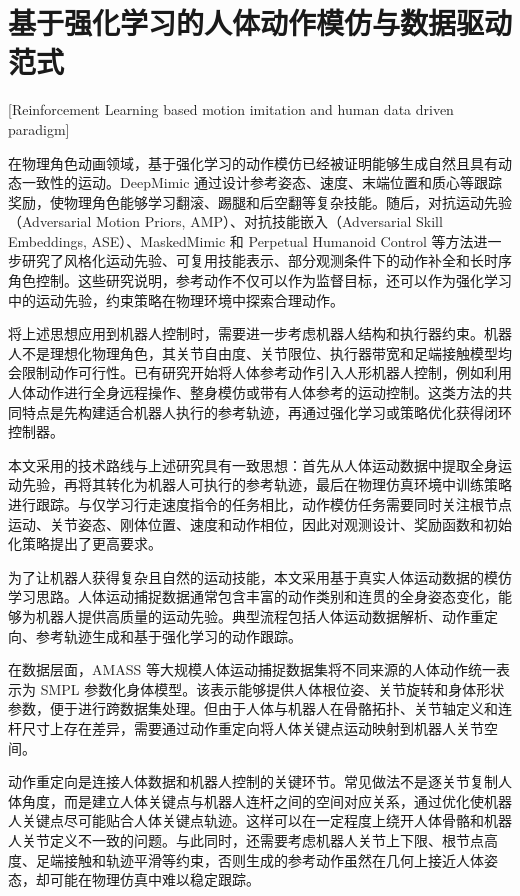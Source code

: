 \section{基于强化学习的人体动作模仿与数据驱动范式}[Reinforcement Learning based motion imitation and human data driven paradigm]

在物理角色动画领域，基于强化学习的动作模仿已经被证明能够生成自然且具有动态一致性的运动。DeepMimic 通过设计参考姿态、速度、末端位置和质心等跟踪奖励，使物理角色能够学习翻滚、踢腿和后空翻等复杂技能\cite{deepmimic2018}。随后，对抗运动先验（Adversarial Motion Priors, AMP）、对抗技能嵌入（Adversarial Skill Embeddings, ASE）、MaskedMimic 和 Perpetual Humanoid Control 等方法进一步研究了风格化运动先验、可复用技能表示、部分观测条件下的动作补全和长时序角色控制\cite{peng2021amp,peng2022ase,tessler2024maskedmimic,luo2023perpetual}。这些研究说明，参考动作不仅可以作为监督目标，还可以作为强化学习中的运动先验，约束策略在物理环境中探索合理动作。

将上述思想应用到机器人控制时，需要进一步考虑机器人结构和执行器约束。机器人不是理想化物理角色，其关节自由度、关节限位、执行器带宽和足端接触模型均会限制动作可行性。已有研究开始将人体参考动作引入人形机器人控制，例如利用人体动作进行全身远程操作、整身模仿或带有人体参考的运动控制\cite{he2024learning,zhang2024whole,fu2024humanplus}。这类方法的共同特点是先构建适合机器人执行的参考轨迹，再通过强化学习或策略优化获得闭环控制器。

本文采用的技术路线与上述研究具有一致思想：首先从人体运动数据中提取全身运动先验，再将其转化为机器人可执行的参考轨迹，最后在物理仿真环境中训练策略进行跟踪。与仅学习行走速度指令的任务相比，动作模仿任务需要同时关注根节点运动、关节姿态、刚体位置、速度和动作相位，因此对观测设计、奖励函数和初始化策略提出了更高要求。

为了让机器人获得复杂且自然的运动技能，本文采用基于真实人体运动数据的模仿学习思路。人体运动捕捉数据通常包含丰富的动作类别和连贯的全身姿态变化，能够为机器人提供高质量的运动先验。典型流程包括人体运动数据解析、动作重定向、参考轨迹生成和基于强化学习的动作跟踪\cite{he2024learning,tessler2024maskedmimic}。

在数据层面，AMASS 等大规模人体运动捕捉数据集将不同来源的人体动作统一表示为 SMPL 参数化身体模型\cite{amass2019}。该表示能够提供人体根位姿、关节旋转和身体形状参数，便于进行跨数据集处理。但由于人体与机器人在骨骼拓扑、关节轴定义和连杆尺寸上存在差异，需要通过动作重定向将人体关键点运动映射到机器人关节空间。

动作重定向是连接人体数据和机器人控制的关键环节。常见做法不是逐关节复制人体角度，而是建立人体关键点与机器人连杆之间的空间对应关系，通过优化使机器人关键点尽可能贴合人体关键点轨迹。这样可以在一定程度上绕开人体骨骼和机器人关节定义不一致的问题。与此同时，还需要考虑机器人关节上下限、根节点高度、足端接触和轨迹平滑等约束，否则生成的参考动作虽然在几何上接近人体姿态，却可能在物理仿真中难以稳定跟踪\cite{he2024learning,zhang2024whole}。

